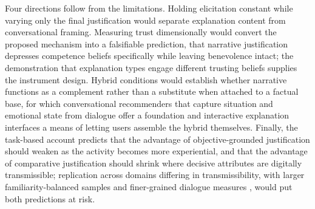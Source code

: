 \documentclass[conference]{IEEEtran}
\begin{document}
Four directions follow from the limitations. Holding elicitation constant while varying only
the final justification would separate explanation content from conversational framing.
Measuring trust dimensionally would convert the proposed mechanism into a falsifiable
prediction, that narrative justification depresses competence beliefs specifically while
leaving benevolence intact; the demonstration that explanation types engage different
trusting beliefs \cite{wang2007} supplies the instrument design. Hybrid conditions would
establish whether narrative functions as a complement rather than a substitute when
attached to a factual base, for which conversational recommenders that capture situation
and emotional state from dialogue \cite{yang2025} offer a foundation and interactive
explanation interfaces \cite{ziegler2023} a means of letting users assemble the hybrid
themselves. Finally, the task-based account predicts that the advantage of
objective-grounded justification should weaken as the activity becomes more experiential,
and that the advantage of comparative justification should shrink where decisive attributes
are digitally transmissible; replication across domains differing in transmissibility, with
larger familiarity-balanced samples and finer-grained dialogue measures \cite{siro2023},
would put both predictions at risk.
\end{document}
